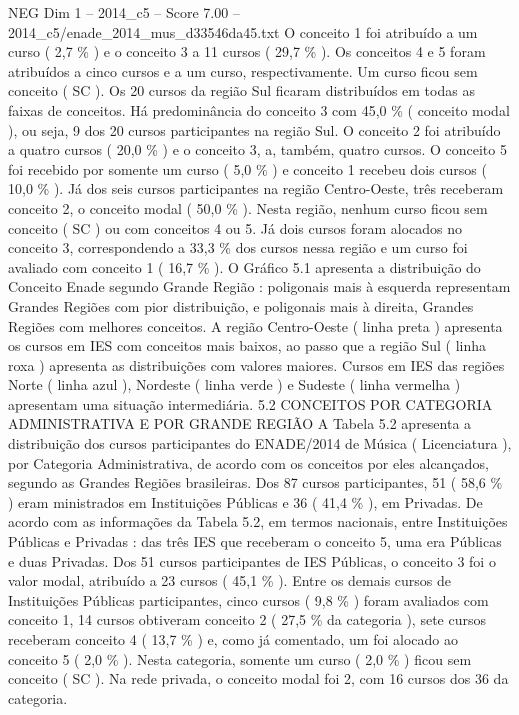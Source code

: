 \begin{textsample}{NEG Dim 1 – 2014\_c5 – Score 7.00 – 2014\_c5/enade\_2014\_mus\_d33546da45.txt}
O conceito 1 foi atribuído a um curso ( 2,7 \% ) e o conceito 3 a 11 cursos ( 29,7 \% ).
Os conceitos 4 e 5 foram atribuídos a cinco cursos e a um curso, respectivamente.
Um curso ficou sem conceito ( SC ).
Os 20 cursos da região Sul ficaram distribuídos em todas as faixas de conceitos.
Há predominância do conceito 3 com 45,0 \% ( conceito modal ), ou seja, 9 dos 20 cursos participantes na região Sul.
O conceito 2 foi atribuído a quatro cursos ( 20,0 \% ) e o conceito 3, a, também, quatro cursos.
O conceito 5 foi recebido por somente um curso ( 5,0 \% ) e conceito 1 recebeu dois cursos ( 10,0 \% ).
Já dos seis cursos participantes na região Centro-Oeste, três receberam conceito 2, o conceito modal ( 50,0 \% ).
Nesta região, nenhum curso ficou sem conceito ( SC ) ou com conceitos 4 ou 5.
Já dois cursos foram alocados no conceito 3, correspondendo a 33,3 \% dos cursos nessa região e um curso foi avaliado com conceito 1 ( 16,7 \% ).
O Gráfico 5.1 apresenta a distribuição do Conceito Enade segundo Grande Região : poligonais mais à esquerda representam Grandes Regiões com pior distribuição, e poligonais mais à direita, Grandes Regiões com melhores conceitos.
A região Centro-Oeste ( linha preta ) apresenta os cursos em IES com conceitos mais baixos, ao passo que a região Sul ( linha roxa ) apresenta as distribuições com valores maiores.
Cursos em IES das regiões Norte ( linha azul ), Nordeste ( linha verde ) e Sudeste ( linha vermelha ) apresentam uma situação intermediária. 5.2 CONCEITOS POR CATEGORIA ADMINISTRATIVA E POR GRANDE REGIÃO A Tabela 5.2 apresenta a distribuição dos cursos participantes do ENADE/2014 de Música ( Licenciatura ), por Categoria Administrativa, de acordo com os conceitos por eles alcançados, segundo as Grandes Regiões brasileiras.
Dos 87 cursos participantes, 51 ( 58,6 \% ) eram ministrados em Instituições Públicas e 36 ( 41,4 \% ), em Privadas.
De acordo com as informações da Tabela 5.2, em termos nacionais, entre Instituições Públicas e Privadas : das três IES que receberam o conceito 5, uma era Públicas e duas Privadas.
Dos 51 cursos participantes de IES Públicas, o conceito 3 foi o valor modal, atribuído a 23 cursos ( 45,1 \% ).
Entre os demais cursos de Instituições Públicas participantes, cinco cursos ( 9,8 \% ) foram avaliados com conceito 1, 14 cursos obtiveram conceito 2 ( 27,5 \% da categoria ), sete cursos receberam conceito 4 ( 13,7 \% ) e, como já comentado, um foi alocado ao conceito 5 ( 2,0 \% ).
Nesta categoria, somente um curso ( 2,0 \% ) ficou sem conceito ( SC ).
Na rede privada, o conceito modal foi 2, com 16 cursos dos 36 da categoria.

\end{textsample}
